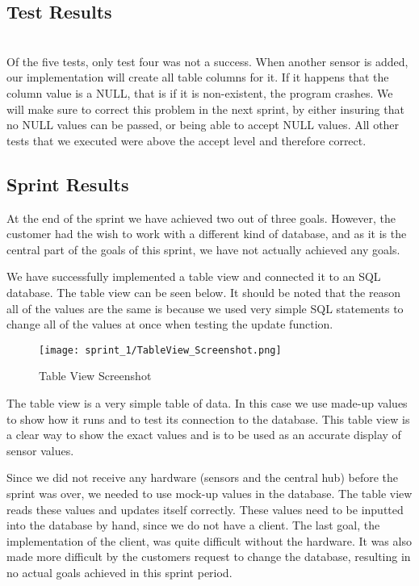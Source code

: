 \documentclass[../document.tex]{subfiles}
\begin{document}
\subsection{Test Results} \ \\
Of the five tests, only test four was not a success. When another sensor is added, our implementation will create all table columns for it. If it happens that the column value is a NULL, that is if it is non-existent, the program crashes. We will make sure to correct this problem in the next sprint, by either insuring that no NULL values can be passed, or being able to accept NULL values. All other tests that we executed were above the accept level and therefore correct.

\subsection{Sprint Results}
At the end of the sprint we have achieved two out of three goals. However, the customer had the wish to work with a different kind of database, and as it is the central part of the goals of this sprint, we have not actually achieved any goals.

We have successfully implemented a table view and connected it to an \gls{SQL} database. The table view can be seen below. It should be noted that the reason all of the values are the same is because we used very simple \gls{SQL} statements to change all of the values at once when testing the update function.

\begin{figure}
\centering
\texttt{[image: sprint\_1/TableView\_Screenshot.png]}
\caption{Table View Screenshot}
\end{figure}

The table view is a very simple table of data. In this case we use made-up values to show how it runs and to test its connection to the database. This table view is a clear way to show the exact values and is to be used as an accurate display of sensor values. 

Since we did not receive any hardware (sensors and the central hub) before the sprint was over, we needed to use mock-up values in the database. The table view reads these values and updates itself correctly. These values need to be inputted into the database by hand, since we do not have a client. The last goal, the implementation of the client, was quite difficult without the hardware. It was also made more difficult by the customers request to change the database, resulting in no actual goals achieved in this sprint period.
\end{document}
